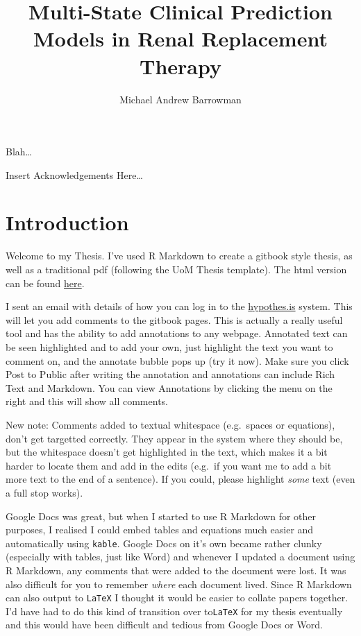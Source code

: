 \documentclass[12pt,PhD,twoside,openright]{muthesis}
\begin{document}
\title{Multi-State Clinical Prediction Models in Renal Replacement Therapy}
\author{Michael Andrew Barrowman}
\principaladviser{}
\faculty{}
\school{}
\beforeabstract

Blah\ldots{}

\afterabstract


\begingroup

\setlength{\parskip}{15pt}
\setlength{\parindent}{0pt}
Insert Acknowledgements Here\ldots{}

\par
\endgroup
\afterpreface

\hypertarget{introduction}{%
\chapter*{Introduction}\label{introduction}}

Welcome to my Thesis. I've used R Markdown to create a gitbook style thesis, as well as a traditional pdf (following the UoM Thesis template). The html version can be found \href{https://michaelbarrowman.co.uk/thesis}{here}.

I sent an email with details of how you can log in to the \href{https://hypothes.is/}{hypothes.is} system. This will let you add comments to the gitbook pages. This is actually a really useful tool and has the ability to add annotations to any webpage. Annotated text can be seen highlighted and to add your own, just highlight the text you want to comment on, and the annotate bubble pops up (try it now). Make sure you click Post to Public after writing the annotation and annotations can include Rich Text and Markdown. You can view Annotations by clicking the menu on the right and this will show all comments.

New note: Comments added to textual whitespace (e.g.~spaces or equations), don't get targetted correctly. They appear in the system where they should be, but the whitespace doesn't get highlighted in the text, which makes it a bit harder to locate them and add in the edits (e.g.~if you want me to add a bit more text to the end of a sentence). If you could, please highlight \emph{some} text (even a full stop works).

Google Docs was great, but when I started to use R Markdown for other purposes, I realised I could embed tables and equations much easier and automatically using \texttt{kable}. Google Docs on it's own became rather clunky (especially with tables, just like Word) and whenever I updated a document using R Markdown, any comments that were added to the document were lost. It was also difficult for you to remember \emph{where} each document lived. Since R Markdown can also output to \texttt{LaTeX} I thought it would be easier to collate papers together. I'd have had to do this kind of transition over to\texttt{LaTeX} for my thesis eventually and this would have been difficult and tedious from Google Docs or Word.
\end{document}
